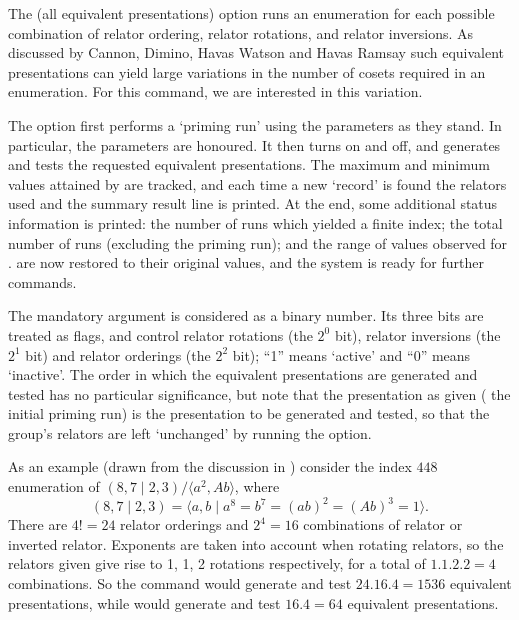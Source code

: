 \quad{}

The  (all equivalent presentations) option runs an enumeration
  for each possible combination of relator ordering, relator rotations,
  and relator inversions.
As discussed by Cannon, Dimino, Havas \amp Watson \cite{CDHW} and Havas
  \amp Ramsay \cite{HR1} such equivalent presentations can yield large
  variations in the number of cosets required in an enumeration.
For this command, we are interested in this variation.

The  option first performs a `priming run' using the parameters
  as they stand.
In particular, the  \amp {} parameters are honoured.
It then turns  on and  off, and generates and tests
  the requested equivalent presentations.
The maximum and minimum values attained by  \amp {}
  are tracked, and each time a new `record' is found the relators used and
  the summary result line is printed.
At the end, some additional status information is printed: 
  the number of runs which yielded a finite index; 
  the total number of runs (excluding the priming run); 
  and the range of values observed for  \amp {}.
 \amp {} are now restored to their original values, and 
  the system is ready for further commands.

The mandatory argument is considered as a binary number.
Its three bits are treated as flags, and control relator rotations (the
  $2^0$ bit), relator inversions (the $2^1$ bit) and relator orderings
  (the $2^2$ bit); ``1'' means `active' and ``0'' means
  `inactive'\kern-1.5pt.
The order in which the equivalent presentations are generated and tested
  has no particular significance, but note that the presentation as given
  (\kern-1.5pt the initial priming run) is the 
  presentation to be generated and tested, so that the group's relators are
  left `unchanged' by running the  option.

As an example (drawn from the discussion in \cite{HR1}) consider the index
  $448$ enumeration of $(8,7 \mid 2,3) / \langle a^2,Ab \rangle$,
  where $$ (8,7 \mid 2,3) 
    = \langle a,b \mid a^8 = b^7 = (ab)^2 = (Ab)^3 = 1 \rangle . $$
There are $4!=24$ relator orderings and $2^4=16$ combinations of relator or
  inverted relator.
Exponents are taken into account when rotating relators, so the relators
  given give rise to 1, 1, 2  rotations respectively, for a total
  of $1.1.2.2=4$ combinations.
So the command  would generate and test $24.16.4=1536$ 
  equivalent presentations, while  would generate and test 
  $16.4=64$ equivalent presentations.

